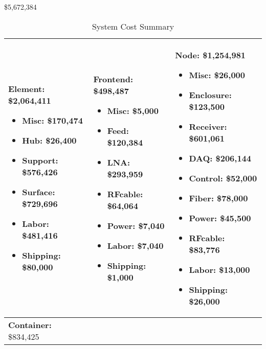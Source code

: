 \$5,672,384

\begin{table}[ht]
\centering
\caption{System Cost Summary}
\label{tab:budgetsummary}
\begin{tabular}{| p{2in} | p{2in} | p{2in} | } \hline
\noindent
\textbf{Element:}  \$2,064,411
\vspace{-.1in}
\begin{itemize}[parsep=-2pt, itemsep=-3pt]
\item Misc:   \$170,474
\item Hub:   \$26,400
\item Support:   \$576,426
\item Surface:   \$729,696
\item Labor:   \$481,416
\item Shipping:   \$80,000
\end{itemize}
 &
\noindent
\textbf{Frontend:}  \$498,487
\vspace{-.1in}
\begin{itemize}[parsep=-2pt, itemsep=-3pt]
\item Misc:   \$5,000
\item Feed:   \$120,384
\item LNA:   \$293,959
\item RFcable:   \$64,064
\item Power:   \$7,040
\item Labor:   \$7,040
\item Shipping:   \$1,000
\end{itemize}
 &
\noindent
\textbf{Node:}  \$1,254,981
\vspace{-.1in}
\begin{itemize}[parsep=-2pt, itemsep=-3pt]
\item Misc:   \$26,000
\item Enclosure:   \$123,500
\item Receiver:   \$601,061
\item DAQ:   \$206,144
\item Control:   \$52,000
\item Fiber:   \$78,000
\item Power:   \$45,500
\item RFcable:   \$83,776
\item Labor:   \$13,000
\item Shipping:   \$26,000
\vspace{-.1in}
\end{itemize}
\\ \hline
\noindent
\textbf{Container:}  \$834,425

\end{tabular}
\end{table}
